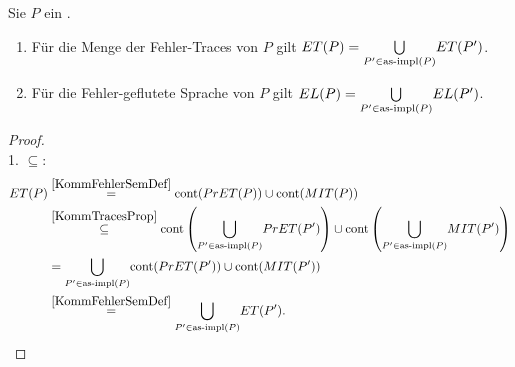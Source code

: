 \begin{Prop}
  \label{KommSemProp}
  Sie $P$ ein \MEIO{}.
  \begin{enumerate}
    \item Für die Menge der Fehler-Traces von $P$ gilt $ET (P) =
      \underset{P'\in\mathrm{as}\text{-}\mathrm{impl} (P)}{\bigcup} ET (P')$.
    \item Für die Fehler-geflutete Sprache von $P$ gilt $EL (P) =
      \underset{P'\in\mathrm{as}\text{-}\mathrm{impl} (P)}{\bigcup} EL (P')$.
  \end{enumerate}
\end{Prop}
\begin{proof}\mbox{}\\
  1. \glqq$\subseteq$\grqq{}:
  {\allowdisplaybreaks
  \begin{align*}
    ET (P)&\overset{\ref{KommFehlerSemDef}}{=} \mathrm{cont} (PrET (P))\cup \mathrm{cont}
    (MIT (P))\\
    &\overset{\ref{KommTracesProp}}{\subseteq} \mathrm{cont}
    \left(\underset{P'\in\mathrm{as}\text{-}\mathrm{impl} (P)}{\bigcup} PrET (P')\right)\cup \mathrm{cont}
    \left(\underset{P'\in\mathrm{as}\text{-}\mathrm{impl} (P)}{\bigcup} MIT (P')\right)\\
    &= \underset{P'\in\mathrm{as}\text{-}\mathrm{impl} (P)}{\bigcup} \mathrm{cont} (PrET (P'))\cup \mathrm{cont} (MIT
    (P'))\\
    &\overset{\ref{KommFehlerSemDef}}{=} \underset{P'\in\mathrm{as}\text{-}\mathrm{impl}
    (P)}{\bigcup} ET (P').
  \end{align*}}


\end{proof}
